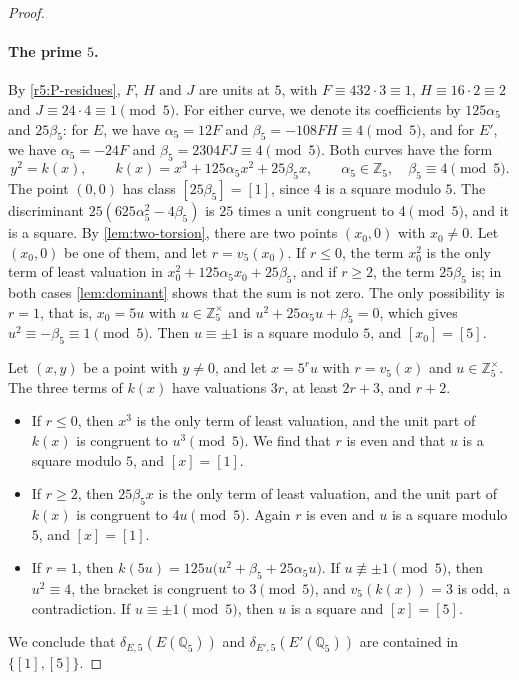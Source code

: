 \documentclass[12pt,oneside,openany]{book}
\theoremstyle{definition}
\theoremstyle{plain}
\numberwithin{equation}{chapter}
\theoremstyle{plain}
\theoremstyle{definition}
\theoremstyle{remark}
\newcommand{\Q}{\mathbb Q}
\newcommand{\Z}{\mathbb Z}
\newcommand{\sq}[1]{[#1]}
\begin{document}
\begin{proof}
\paragraph{The prime $5$.} By \eqref{r5:P-residues}, $F$, $H$ and $J$ are units at $5$, with $F\equiv432\cdot3\equiv1$, $H\equiv16\cdot2\equiv2$ and $J\equiv24\cdot4\equiv1\pmod5$. For either curve, we denote its coefficients by $125\alpha_5$ and $25\beta_5$: for $E$, we have $\alpha_5=12F$ and $\beta_5=-108FH\equiv4\pmod5$, and for $E'$, we have $\alpha_5=-24F$ and $\beta_5=2304FJ\equiv4\pmod5$. Both curves have the form
\[
y^2=k(x),\qquad k(x)=x^3+125\alpha_5x^2+25\beta_5x,\qquad \alpha_5\in\Z_5,\quad\beta_5\equiv4\pmod5.
\]
The point $(0,0)$ has class $\sq{25\beta_5}=\sq1$, since $4$ is a square modulo $5$. The discriminant $25(625\alpha_5^2-4\beta_5)$ is $25$ times a unit congruent to $4\pmod5$, and it is a square. By \cref{lem:two-torsion}, there are two points $(x_0,0)$ with $x_0\ne0$. Let $(x_0,0)$ be one of them, and let $r=v_5(x_0)$. If $r\le0$, the term $x_0^2$ is the only term of least valuation in $x_0^2+125\alpha_5x_0+25\beta_5$, and if $r\ge2$, the term $25\beta_5$ is; in both cases \cref{lem:dominant} shows that the sum is not zero. The only possibility is $r=1$, that is, $x_0=5u$ with $u\in\Z_5^\times$ and $u^2+25\alpha_5u+\beta_5=0$, which gives $u^2\equiv-\beta_5\equiv1\pmod5$. Then $u\equiv\pm1$ is a square modulo $5$, and $\sq{x_0}=\sq5$.

Let $(x,y)$ be a point with $y\ne0$, and let $x=5^ru$ with $r=v_5(x)$ and $u\in\Z_5^\times$. The three terms of $k(x)$ have valuations $3r$, at least $2r+3$, and $r+2$.
\begin{itemize}
\item If $r\le0$, then $x^3$ is the only term of least valuation, and the unit part of $k(x)$ is congruent to $u^3\pmod5$. We find that $r$ is even and that $u$ is a square modulo $5$, and $\sq x=\sq1$.
\item If $r\ge2$, then $25\beta_5x$ is the only term of least valuation, and the unit part of $k(x)$ is congruent to $4u\pmod5$. Again $r$ is even and $u$ is a square modulo $5$, and $\sq x=\sq1$.
\item If $r=1$, then $k(5u)=125u\big(u^2+\beta_5+25\alpha_5u\big)$. If $u\not\equiv\pm1\pmod5$, then $u^2\equiv4$, the bracket is congruent to $3\pmod5$, and $v_5(k(x))=3$ is odd, a contradiction. If $u\equiv\pm1\pmod5$, then $u$ is a square and $\sq x=\sq5$.
\end{itemize}
We conclude that $\delta_{E,5}(E(\Q_5))$ and $\delta_{E',5}(E'(\Q_5))$ are contained in $\{\sq1,\sq5\}$.


\end{proof}
\end{document}
